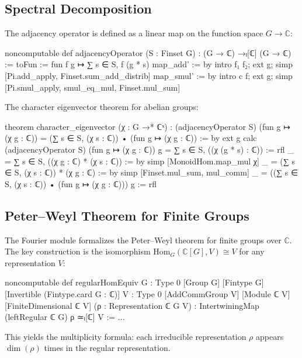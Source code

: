 \documentclass[11pt]{article}
\theoremstyle{plain}
\theoremstyle{definition}
\theoremstyle{remark}
\begin{document}
\subsection{Spectral Decomposition}

The adjacency operator is defined as a linear map on the function space $G\to\mathbb{C}$:

\begin{lean}
noncomputable def adjacencyOperator (S : Finset G) :
    (G → ℂ) →ₗ[ℂ] (G → ℂ) :=
  { toFun := fun f g ↦ ∑ s ∈ S, f (g * s)
    map_add' := by intro f₁ f₂; ext g;
                   simp [Pi.add_apply, Finset.sum_add_distrib]
    map_smul' := by intro c f; ext g;
                   simp [Pi.smul_apply, smul_eq_mul, Finset.mul_sum] }
\end{lean}

The character eigenvector theorem for abelian groups:

\begin{lean}
theorem character_eigenvector (χ : G →* ℂˣ) :
    (adjacencyOperator S) (fun g ↦ (χ g : ℂ)) =
    (∑ s ∈ S, (χ s : ℂ)) • (fun g ↦ (χ g : ℂ)) := by
  ext g
  calc
    (adjacencyOperator S) (fun g ↦ (χ g : ℂ)) g
        = ∑ s ∈ S, ((χ (g * s) : ℂ)) := rfl
    _ = ∑ s ∈ S, ((χ g : ℂ) * (χ s : ℂ)) := by
      simp [MonoidHom.map_mul χ]
    _ = (∑ s ∈ S, (χ s : ℂ)) * (χ g : ℂ) := by
      simp [Finset.mul_sum, mul_comm]
    _ = ((∑ s ∈ S, (χ s : ℂ)) • (fun g ↦ (χ g : ℂ))) g := rfl
\end{lean}

\subsection{Peter--Weyl Theorem for Finite Groups}

The Fourier module formalizes the Peter--Weyl theorem for finite groups over $\mathbb{C}$.
The key construction is the isomorphism $\mathrm{Hom}_G(\mathbb{C}[G], V) \cong V$ for any representation $V$:

\begin{lean}
noncomputable def regularHomEquiv {G : Type 0} [Group G] [Fintype G]
    [Invertible (Fintype.card G : ℂ)] {V : Type 0} [AddCommGroup V]
    [Module ℂ V] [FiniteDimensional ℂ V]
    (ρ : Representation ℂ G V) :
    IntertwiningMap (leftRegular ℂ G) ρ ≃ₗ[ℂ] V := ...
\end{lean}

This yields the multiplicity formula: each irreducible representation $\rho$ appears $\dim(\rho)$ times in the regular representation.
\end{document}
